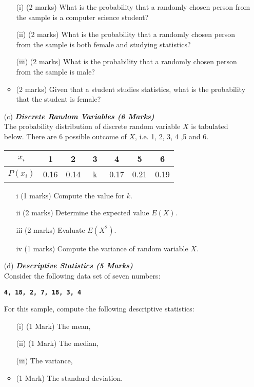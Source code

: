 \documentclass[]{article}
\begin{document}
\begin{itemize}
\begin{itemize}
\item[(i)] (2 marks) What is the probability that a randomly chosen person from the sample is a
computer science student?
\item[(ii)] (2 marks) What is the probability that a randomly chosen person from the sample is both female and studying statistics?
\item[(iii)] (2 marks) What is the probability that a randomly chosen person from the sample is male?
\item  (2 marks) Given that a student studies statistics, what is the probability that the student is female?
\end{itemize}
\item[(c)] \textbf{\textit{Discrete Random Variables (6 Marks)}}\\The probability distribution of discrete random variable $X$ is tabulated below. There are 6 possible outcome of $X$, i.e. 1, 2, 3, 4 ,5 and 6.
\begin{center}
\begin{tabular}{|c||c|c|c|c|c|c|}
\hline
$x_i$  & 1 & 2 & 3 & 4 & 5 & 6 \\\hline
$P(x_i)$ & 0.16 & 0.14 & \mbox{   k   } & 0.17 & 0.21 & 0.19\\
\hline
\end{tabular}
\end{center}

\begin{itemize}
\item[i] (1 marks) Compute the value for $k$.
\item[ii] (2 marks) Determine the expected value $E(X)$.
\item[iii] (2 marks) Evaluate $E(X^2)$.
\item[iv] (1 marks) Compute the variance of random variable $X$.
\end{itemize}\item[(d)] \textbf{\textit{Descriptive Statistics (5 Marks)}}\\
Consider the following data set of seven numbers:

\begin{center}
\textbf{\texttt{4, 18,  2,  7, 18,  3,  4 }}
\end{center}

\noindent For this sample, compute the following descriptive statistics:
\begin{itemize}
\item[(i)] (1 Mark) The mean,
\item[(ii)] (1 Mark) The median,
\item[(iii)]  The variance,
\item  (1 Mark) The standard deviation.
\end{itemize}
\end{itemize}
\end{document}

